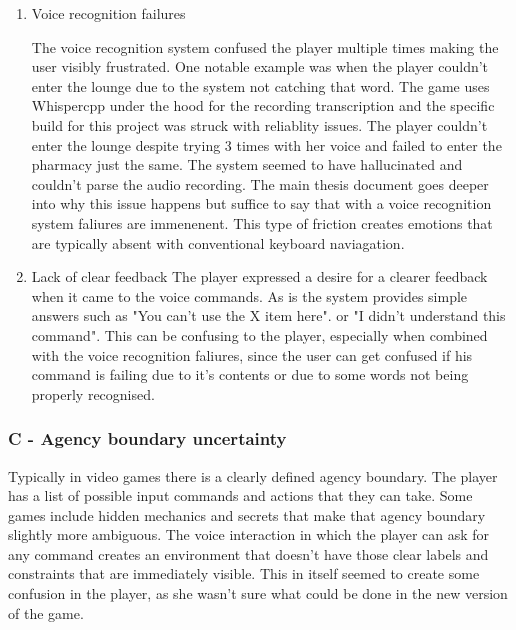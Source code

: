 \begin{enumerate}
    \item Voice recognition failures
    
    The voice recognition system confused the player multiple times making the user visibly frustrated. One notable example was when the player couldn't enter the lounge due to the system not catching that word. The game uses Whispercpp under the hood for the recording transcription and the specific build for this project was struck with reliablity issues. The player couldn't enter the lounge despite trying 3 times with her voice and failed to enter the pharmacy just the same. The system seemed to have hallucinated and couldn't parse the audio recording. The main thesis document goes deeper into why this issue happens but suffice to say that with a voice recognition system faliures are immenenent. This type of friction creates emotions that are typically absent with conventional keyboard naviagation.

    \item Lack of clear feedback
    The player expressed a desire for a clearer feedback when it came to the voice commands. As is the system provides simple answers such as "You can't use the X item here". or "I didn't understand this command". This can be confusing to the player, especially when combined with the voice recognition faliures, since the user can get confused if his command is failing due to it's contents or due to some words not being properly recognised. 
\end{enumerate}


\subsubsection{C - Agency boundary uncertainty}


Typically in video games there is a clearly defined agency boundary. The player has a list of possible input commands and actions that they can take. Some games include hidden mechanics and secrets that make that agency boundary slightly more ambiguous. The voice interaction in which the player can ask for any command creates an environment that doesn't have those clear labels and constraints that are immediately visible. This in itself seemed to create some confusion in the player, as she wasn't sure what could be done in the new version of the game.  


